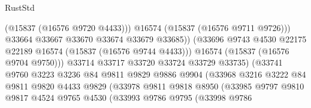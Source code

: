 \begin{lexlean}{RustStd}
\begin{coremodule}
                                            (@15837 (@16576 @9720 @4433)))
                                          @16574
                                          (@15837 (@16576 @9711 @9726)))
                                        @33664
                                        @33667
                                        @33670
                                        @33674
                                        @33679
                                        @33685))
                                    (@33696
                                      @9743
                                      @4530
                                      @22175
                                      @22189
                                      @16574
                                      (@15837 (@16576 @9744 @4433)))
                                    @16574
                                    (@15837 (@16576 @9704 @9750)))
                                  @33714
                                  @33717
                                  @33720
                                  @33724
                                  @33729
                                  @33735)
                                (@33741
                                  @9760
                                  @3223
                                  @3236
                                  @84
                                  @9811
                                  @9829
                                  @9886
                                  @9904
                                  (@33968
                                    @3216
                                    @3222
                                    @84
                                    @9811
                                    @9820
                                    @4433
                                    @9829
                                    (@33978
                                      @9811
                                      @9818
                                      @8950
                                      (@33985
                                        @9797
                                        @9810
                                        @9817
                                        @4524
                                        @9765
                                        @4530
                                        (@33993
                                          @9786
                                          @9795
                                          (@33998
                                            @9786

\end{coremodule}
\end{lexlean}
